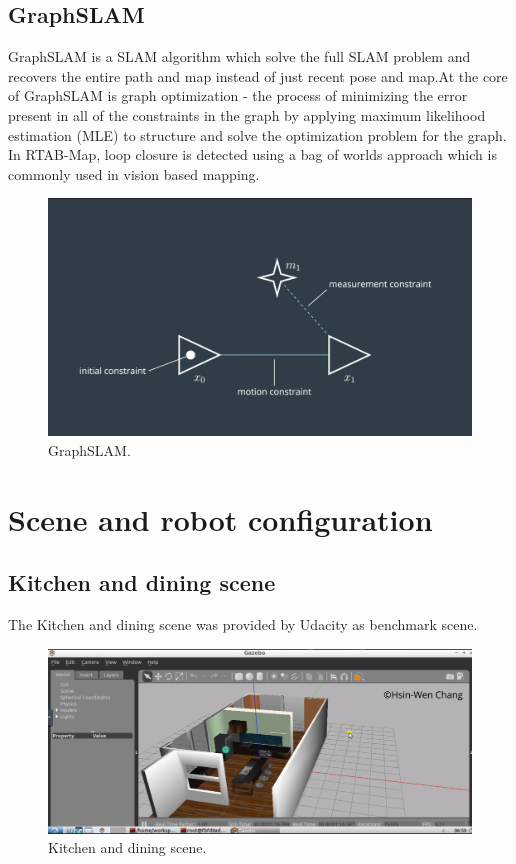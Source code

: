 \documentclass[10pt,journal,compsoc]{IEEEtran}
\begin{document}
\subsection{GraphSLAM}
GraphSLAM is a SLAM algorithm which solve the full SLAM problem and recovers the entire path and map instead of just recent pose and map.At the core of GraphSLAM is graph optimization - the process of minimizing the error present in all of the constraints in the graph by applying maximum likelihood estimation (MLE) to structure and solve the optimization problem for the graph.
In RTAB-Map, loop closure is detected using a bag of worlds approach which is commonly used in vision based mapping.
\begin{figure}[thpb]
      \centering
      \includegraphics[width=\linewidth]{GraphSLAM.png}
      \caption{GraphSLAM.}
      \label{fig:robot1}
\end{figure}
\section{Scene and robot configuration}

\subsection{Kitchen and dining scene}
The Kitchen and dining scene was provided by Udacity as benchmark scene.
\begin{figure}[thpb]
      \centering
      \includegraphics[width=\linewidth]{MapMyworld.png}
      \caption{Kitchen and dining scene.}
      \label{fig:robot1}
\end{figure}
\end{document}
